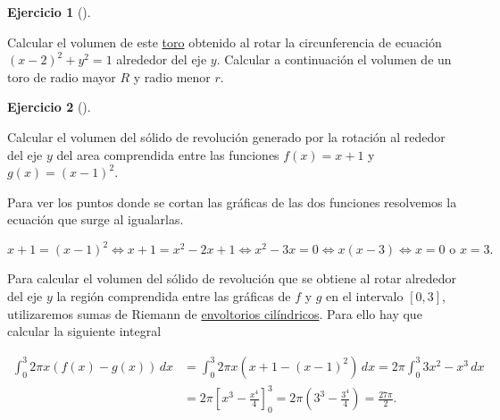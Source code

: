 \documentclass[
  spanish,
  a4paper,
]{scrreport}
\theoremstyle{definition}
\newtheorem{exercise}{Ejercicio}[chapter]
\theoremstyle{remark}
\begin{document}
\begin{exercise}[]\protect\hypertarget{exr-volumen-toro}{}\label{exr-volumen-toro}

Calcular el volumen de este
\href{https://www.geogebra.org/m/wy2uquqc}{toro} obtenido al rotar la
circunferencia de ecuación \((x-2)^2+y^2=1\) alrededor del eje \(y\).
Calcular a continuación el volumen de un toro de radio mayor \(R\) y
radio menor \(r\).

\end{exercise}

\begin{exercise}[]\protect\hypertarget{exr-volumen-revolucion-2}{}\label{exr-volumen-revolucion-2}

Calcular el volumen del sólido de revolución generado por la rotación al
rededor del eje \(y\) del area comprendida entre las funciones
\(f(x)=x+1\) y \(g(x)=(x-1)^2\).

\end{exercise}

\begin{tcolorbox}[enhanced jigsaw, arc=.35mm, bottomrule=.15mm, bottomtitle=1mm, breakable, colback=white, colbacktitle=quarto-callout-tip-color!10!white, colframe=quarto-callout-tip-color-frame, coltitle=black, left=2mm, leftrule=.75mm, opacityback=0, opacitybacktitle=0.6, rightrule=.15mm, title=\textcolor{quarto-callout-tip-color}{\faLightbulb}\hspace{0.5em}{Solución}, titlerule=0mm, toprule=.15mm, toptitle=1mm]

Para ver los puntos donde se cortan las gráficas de las dos funciones
resolvemos la ecuación que surge al igualarlas.

\[
x+1 = (x-1)^2 \Leftrightarrow x+1 = x^2-2x+1 \Leftrightarrow x^2-3x= 0 \Leftrightarrow x(x-3) \Leftrightarrow x=0 \mbox{ o } x=3.
\]

Para calcular el volumen del sólido de revolución que se obtiene al
rotar alrededor del eje \(y\) la región comprendida entre las gráficas
de \(f\) y \(g\) en el intervalo \([0,3]\), utilizaremos sumas de
Riemann de
\href{https://aprendeconalf.es/analisis-manual/08-integrales.html\#c\%C3\%A1lculo-de-vol\%C3\%BAmenes-con-envoltorios-cil\%C3\%ADndricos}{envoltorios
cilíndricos}. Para ello hay que calcular la siguiente integral

\begin{align*}
\int_0^3 2\pi x (f(x)-g(x))\,dx 
&= \int_0^3 2\pi x (x+1-(x-1)^2)\,dx 
= 2\pi \int_0^3 3x^2-x^3 \, dx \\
&= 2\pi \left[x^3-\frac{x^4}{4}\right]_0^3
= 2\pi \left(3^3 - \frac{3^4}{4}\right)
= \frac{27\pi}{2}.
\end{align*}

\end{tcolorbox}
\end{document}
